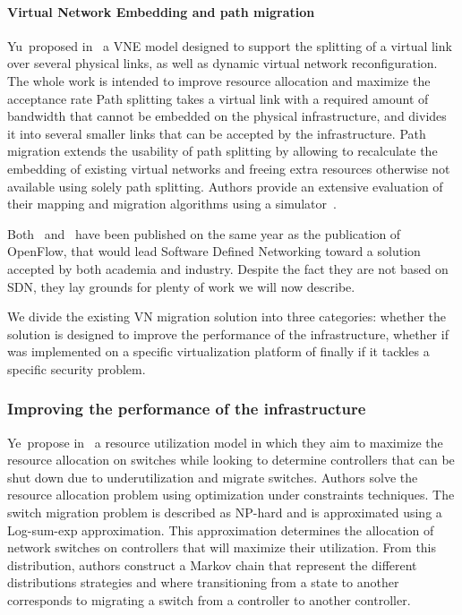 \paragraph{Virtual Network Embedding and path migration}
Yu~\etal proposed in~\cite{VNE-Yu2008} a VNE model designed to support the splitting of a virtual link over several physical links, as well as dynamic virtual network reconfiguration.
The whole work is intended to improve resource allocation and maximize the acceptance rate 
Path splitting takes a virtual link with a required amount of bandwidth that cannot be embedded on the physical infrastructure, and divides it into several smaller links that can be accepted by the infrastructure.
Path migration extends the usability of path splitting by allowing to recalculate the embedding of existing virtual networks and freeing extra resources otherwise not available using solely path splitting.
Authors provide an extensive evaluation of their mapping and migration algorithms using a simulator~\cite{vnesimulator}.

Both~\cite{VROOM-Wang2008} and~\cite{VNE-Yu2008} have been published on the same year as the publication of OpenFlow, that would lead Software Defined Networking toward a solution accepted by both academia and industry.
Despite the fact they are not based on SDN, they lay grounds for plenty of work we will now describe.

We divide the existing VN migration solution into three categories: whether the solution is designed to improve the performance of the infrastructure, whether if was implemented on a specific virtualization platform of finally if it tackles a specific security problem.

\subsubsection{Improving the performance of the infrastructure}
Ye~\etal propose in~\cite{Ye2017a} a resource utilization model in which they aim to maximize the resource allocation on switches while looking to determine controllers that can be shut down due to underutilization and migrate switches.
Authors solve the resource allocation problem using optimization under constraints techniques. 
The switch migration problem is described as NP-hard and is approximated using a Log-sum-exp approximation.
This approximation determines the allocation of network switches on controllers that will maximize their utilization. 
From this distribution, authors construct a Markov chain that represent the different distributions strategies and where transitioning from a state to another corresponds to migrating a switch from a controller to another controller.

